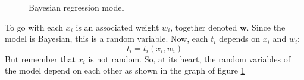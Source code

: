 \documentclass[12pt, a4paper]{article}
\numberwithin{equation}{section}
\begin{document}
\begin{figure}
\centering
{}
\caption{Bayesian regression model}
\label{graph:bayesian_regression}
\end{figure}


To go with each $x_i$ is an associated weight $w_i$, together denoted $\mathbf{w}$. Since the model is Bayesian, this is a random variable. Now, each $t_i$ depends on $x_i$ and $w_i$:
\begin{equation}
t_i=t_i(x_i,w_i)
\end{equation}
But remember that $x_i$ is not random. So, at its heart, the random variables of the model depend on each other as shown in the graph of figure \ref{graph:bayesian_regression}
\end{document}
